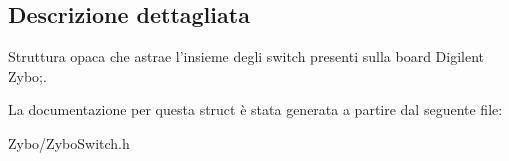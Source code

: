 \subsection{Descrizione dettagliata}
Struttura opaca che astrae l'insieme degli switch presenti sulla board Digilent Zybo;. 

La documentazione per questa struct è stata generata a partire dal seguente file\+:\begin{DoxyCompactItemize}
\item 
Zybo/Zybo\+Switch.\+h\end{DoxyCompactItemize}
